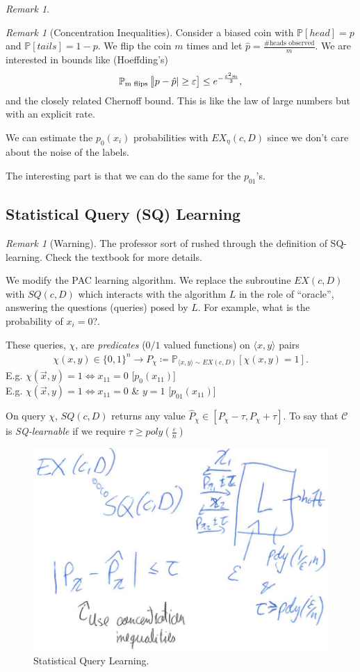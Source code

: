 \documentclass[12pt, letterpaper]{article}
\numberwithin{equation}{section} %
\newcommand{\mb}{\mathbb}
\newcommand{\mc}{\mathcal}
\newcommand{\ve}{\varepsilon}
\theoremstyle{definition}
\theoremstyle{remark}
\newtheorem{remark}[theorem]{Remark}
\begin{document}
\begin{remark}
\begin{remark}[Concentration Inequalities]
Consider a biased coin with $\mb P[head] = p$ and $\mb P[tails]=1-p$. We flip the coin $m$ times and let $\hat p = \frac{\textrm{\# heads observed}}{m}$. We are interested in bounds like (Hoeffding's)
\begin{align}
\mb P_{\textrm{m flips}}\left[\abs{p-\hat p}\geq \ve\right] \leq e^{-\frac{\ve^2m}{3}},
\end{align}
and the closely related Chernoff bound. This is like the law of large numbers but with an explicit rate.
\end{remark}
We can estimate the $p_0(x_i)$ probabilities with $EX_\eta(c, D)$ since we don't care about the noise of the labels.
\end{remark}
The interesting part is that we can do the same for the $p_{01}$'s.

\subsection{Statistical Query (SQ) Learning}
\begin{remark}[Warning]
The professor sort of rushed through the definition of SQ-learning. Check the textbook for more details.
\end{remark}
We modify the PAC learning algorithm. We replace the subroutine $EX(c,D)$ with $SQ(c,D)$ which interacts with the algorithm $L$ in the role of ``oracle'', answering the questions (queries) posed by $L$. For example, what is the probability of $x_i=0$?.

These queries, $\chi$, are \emph{predicates} ($0/1$ valued functions) on $\langle x, y\rangle$ pairs
\begin{align}
\chi(x,y)\in \lbrace 0, 1\rbrace^n \longrightarrow P_{\chi} \coloneqq \mb P_{\langle x,y\rangle\sim EX(c,D)}[\chi(x,y)=1].
\end{align}
E.g. $\chi(\vec x, y) = 1 \iff x_{11}=0$ [$p_{0}(x_{11})$]\\
E.g. $\chi(\vec x, y) = 1 \iff x_{11}=0$ \& $y=1$ [$p_{01}(x_{11})$]

On query $\chi$, $SQ(c,D)$ returns any value $\hat P_\chi  \in \left[P_\chi -\tau, P_\chi +\tau\right]$. To say that $\mc C$ is \emph{SQ-learnable} if  we require $\tau \geq poly\left(\frac\ve n\right)$
\begin{figure}[H]
\centering
\includegraphics[width=0.6\linewidth]{img/sq-learning.png}
\caption{Statistical Query Learning.}
\label{fig:graph}
\end{figure}
\end{document}
